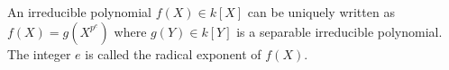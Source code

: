 An irreducible polynomial $f(X) \in k[X]$ can be uniquely written as $f(X) = g(X^{p^e})$ where $g(Y) \in k[Y]$ is a separable irreducible polynomial. The integer $e$ is called the radical exponent of $f(X)$.
